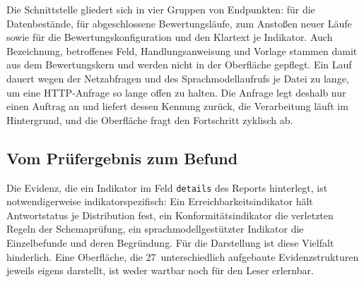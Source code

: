 Die Schnittstelle gliedert sich in vier Gruppen von Endpunkten: für die Datenbestände, für abgeschlossene Bewertungsläufe, zum Anstoßen neuer Läufe sowie für die Bewertungskonfiguration und den Klartext je Indikator. Auch Bezeichnung, betroffenes Feld, Handlungsanweisung und Vorlage stammen damit aus dem Bewertungskern und werden nicht in der Oberfläche gepflegt. Ein Lauf dauert wegen der Netzabfragen und des Sprachmodellaufrufs je Datei zu lange, um eine HTTP-Anfrage so lange offen zu halten. Die Anfrage legt deshalb nur einen Auftrag an und liefert dessen Kennung zurück, die Verarbeitung läuft im Hintergrund, und die Oberfläche fragt den Fortschritt zyklisch ab.

\subsection{Vom Prüfergebnis zum Befund}
\label{subsec:befund}

Die Evidenz, die ein Indikator im Feld \texttt{details} des Reports hinterlegt, ist notwendigerweise indikatorspezifisch: Ein Erreichbarkeitsindikator hält Antwortstatus je Distribution fest, ein Konformitätsindikator die verletzten Regeln der Schemaprüfung, ein sprachmodellgestützter Indikator die Einzelbefunde und deren Begründung. Für die Darstellung ist diese Vielfalt hinderlich. Eine Oberfläche, die 27~unterschiedlich aufgebaute Evidenzstrukturen jeweils eigens darstellt, ist weder wartbar noch für den Leser erlernbar.


